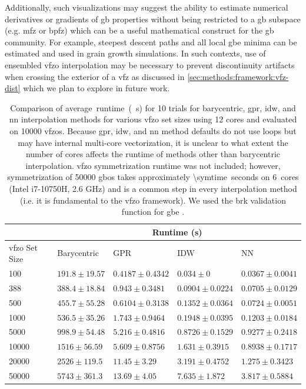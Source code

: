 \documentclass[final,twocolumn,12pt]{elsarticle}
\begin{document}
Additionally, such visualizations may suggest the ability to estimate numerical derivatives or gradients of \gls{gb} properties without being restricted to a \gls{gb} subspace (e.g. \gls{mfz} or \gls{bpfz}) which can be a useful mathematical construct for the \gls{gb} community. For example, steepest descent paths and all local \gls{gbe} minima can be estimated and used in grain growth simulations. In such contexts, use of ensembled \gls{vfzo} interpolation may be necessary to prevent discontinuity artifacts when crossing the exterior of a \gls{vfz} as discussed in \cref{sec:methods:framework:vfz-dist} which we plan to explore in future work.
\begin{table}
\centering
\caption{Comparison of average~runtime~(\SI{}{\second}) for \num{10} trials for barycentric, \gls{gpr}, \gls{idw}, and \gls{nn} interpolation methods for various \inpt{} \gls{vfzo} set sizes using 12 cores and evaluated on \num{10000} \outpt{} \glspl{vfzo}. Because \gls{gpr}, \gls{idw}, and \gls{nn} method defaults do not use  loops but may have internal multi-core vectorization, it is unclear to what extent the number of cores affects the runtime of methods other than barycentric interpolation. \Gls{vfzo} symmetrization runtime was not included; however, symmetrization of \num{50000} \glspl{gbo} takes approximately \SI{\symtime}{seconds} on \SI{6}{cores} (Intel i7-10750H, 2.6 GHz) and is a common step in every interpolation method (i.e. it is fundamental to the \gls{vfzo} framework). We used the \gls{brk} validation function for \gls{gbe} \cite{bulatovGrainBoundaryEnergy2014}. }
\label{tab:runtime}
\begin{tabular}{lllll}
\cline{2-5}
                    & \multicolumn{4}{c}{Runtime (s)}                                                     \\ \hline
\gls{vfzo} Set Size & Barycentric       & GPR                 & IDW                 & NN                  \\ \hline
\num{100}           & $191.8 \pm 19.57$ & $0.4187 \pm 0.4342$ & $0.034 \pm 0$       & $0.0367 \pm 0.0041$ \\
\num{388}           & $388.4 \pm 18.84$ & $0.943 \pm 0.3481$  & $0.0904 \pm 0.0224$ & $0.0705 \pm 0.0129$ \\
\num{500}           & $455.7 \pm 55.28$ & $0.6104 \pm 0.3138$ & $0.1352 \pm 0.0364$ & $0.0724 \pm 0.0051$ \\
\num{1000}          & $536.5 \pm 35.26$ & $1.743 \pm 0.9464$  & $0.1948 \pm 0.0395$ & $0.1203 \pm 0.0184$ \\
\num{5000}          & $998.9 \pm 54.48$ & $5.216 \pm 0.4816$  & $0.8726 \pm 0.1529$ & $0.9277 \pm 0.2418$ \\
\num{10000}         & $1516 \pm 56.59$  & $5.609 \pm 0.8756$  & $1.631 \pm 0.3915$  & $0.8938 \pm 0.1717$ \\
\num{20000}         & $2526 \pm 119.5$  & $11.45 \pm 3.29$    & $3.191 \pm 0.4752$  & $1.275 \pm 0.3423$  \\
\num{50000}         & $5743 \pm 361.3$  & $13.69 \pm 4.05$    & $7.635 \pm 1.872$   & $3.817 \pm 0.5884$  \\ \hline
\end{tabular}
\end{table}
\end{document}
